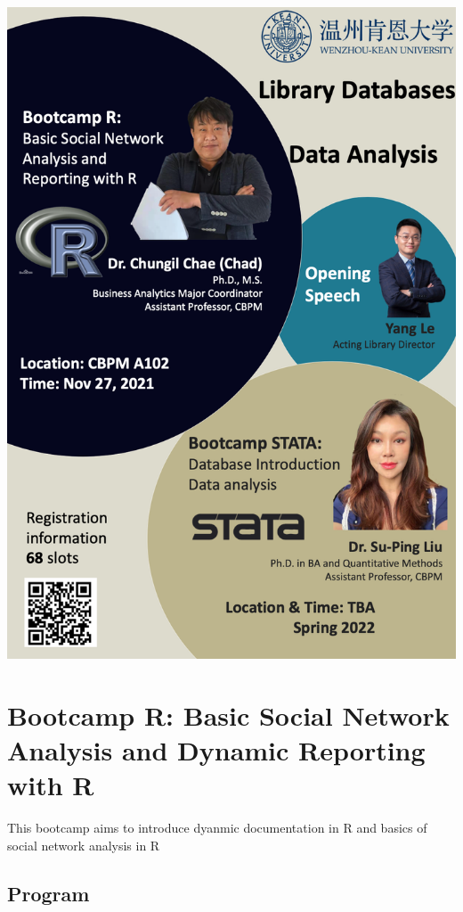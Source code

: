 \documentclass[
]{book}
\begin{document}
\includegraphics[width=6.25in,height=\textheight]{images/0.png}

\hypertarget{bootcamp-r-basic-social-network-analysis-and-dynamic-reporting-with-r}{%
\chapter{Bootcamp R: Basic Social Network Analysis and Dynamic Reporting with R}\label{bootcamp-r-basic-social-network-analysis-and-dynamic-reporting-with-r}}

This bootcamp aims to introduce dyanmic documentation in R and basics of social network analysis in R

\hypertarget{program}{%
\section{Program}\label{program}}
\end{document}
